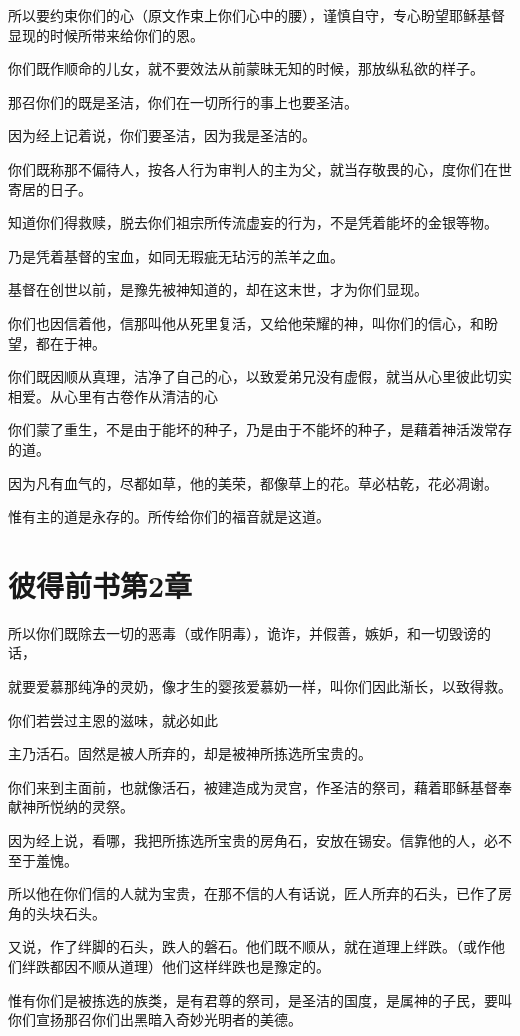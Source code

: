 \documentclass[12pt,oneside]{book}
\begin{document}
所以要约束你们的心（原文作束上你们心中的腰），谨慎自守，专心盼望耶稣基督显现的时候所带来给你们的恩。

你们既作顺命的儿女，就不要效法从前蒙昧无知的时候，那放纵私欲的样子。

那召你们的既是圣洁，你们在一切所行的事上也要圣洁。

因为经上记着说，你们要圣洁，因为我是圣洁的。

你们既称那不偏待人，按各人行为审判人的主为父，就当存敬畏的心，度你们在世寄居的日子。

知道你们得救赎，脱去你们祖宗所传流虚妄的行为，不是凭着能坏的金银等物。

乃是凭着基督的宝血，如同无瑕疵无玷污的羔羊之血。

基督在创世以前，是豫先被神知道的，却在这末世，才为你们显现。

你们也因信着他，信那叫他从死里复活，又给他荣耀的神，叫你们的信心，和盼望，都在于神。

你们既因顺从真理，洁净了自己的心，以致爱弟兄没有虚假，就当从心里彼此切实相爱。从心里有古卷作从清洁的心

你们蒙了重生，不是由于能坏的种子，乃是由于不能坏的种子，是藉着神活泼常存的道。

因为凡有血气的，尽都如草，他的美荣，都像草上的花。草必枯乾，花必凋谢。

惟有主的道是永存的。所传给你们的福音就是这道。

\chapter{彼得前书第2章}
所以你们既除去一切的恶毒（或作阴毒），诡诈，并假善，嫉妒，和一切毁谤的话，

就要爱慕那纯净的灵奶，像才生的婴孩爱慕奶一样，叫你们因此渐长，以致得救。

你们若尝过主恩的滋味，就必如此

主乃活石。固然是被人所弃的，却是被神所拣选所宝贵的。

你们来到主面前，也就像活石，被建造成为灵宫，作圣洁的祭司，藉着耶稣基督奉献神所悦纳的灵祭。

因为经上说，看哪，我把所拣选所宝贵的房角石，安放在锡安。信靠他的人，必不至于羞愧。

所以他在你们信的人就为宝贵，在那不信的人有话说，匠人所弃的石头，已作了房角的头块石头。

又说，作了绊脚的石头，跌人的磐石。他们既不顺从，就在道理上绊跌。（或作他们绊跌都因不顺从道理）他们这样绊跌也是豫定的。

惟有你们是被拣选的族类，是有君尊的祭司，是圣洁的国度，是属神的子民，要叫你们宣扬那召你们出黑暗入奇妙光明者的美德。
\end{document}
